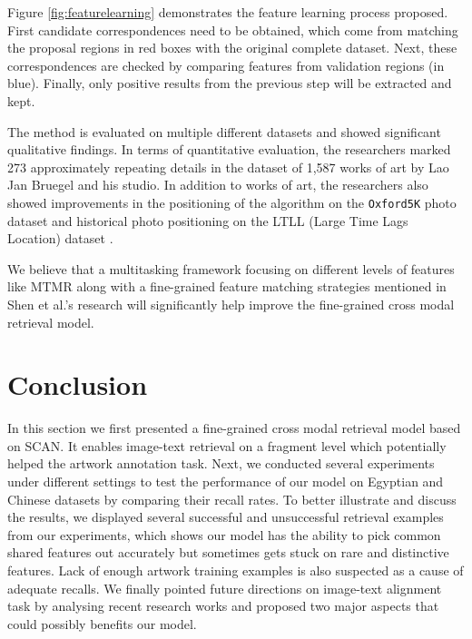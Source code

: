 Figure \ref{fig:featurelearning} demonstrates the feature learning process proposed. First candidate correspondences need to be obtained, which come from matching the proposal regions in red boxes with the original complete dataset. Next, these correspondences are checked by comparing features from validation regions (in blue). Finally, only positive results from the previous step will be extracted and kept. 

The method is evaluated on multiple different datasets and showed significant qualitative findings. In terms of quantitative evaluation, the researchers marked 273 approximately repeating details in the dataset of 1,587 works of art by Lao Jan Bruegel and his studio. In addition to works of art, the researchers also showed improvements in the positioning of the algorithm on the \verb|Oxford5K| photo dataset \cite{Philbin07} and historical photo positioning on the LTLL (Large Time Lags Location) dataset \cite{Fernando2015CVIU}.

We believe that a multitasking framework focusing on different levels of features like MTMR \cite{parttowhole} along with a fine-grained feature matching strategies mentioned in Shen et al.'s research \cite{shen2019discovering} will significantly help improve the fine-grained cross modal retrieval model.

\section{Conclusion}
In this section we first presented a fine-grained cross modal retrieval model based on SCAN. It enables image-text retrieval on a fragment level which potentially helped the artwork annotation task. Next, we conducted several experiments under different settings to test the performance of our model on Egyptian and Chinese datasets by comparing their recall rates. To better illustrate and discuss the results, we displayed several successful and unsuccessful retrieval examples from our experiments, which shows our model has the ability to pick common shared features out accurately but sometimes gets stuck on rare and distinctive features. Lack of enough artwork training examples is also suspected as a cause of adequate recalls. We finally pointed future directions on image-text alignment task by analysing recent research works and proposed two major aspects that could possibly benefits our model.

